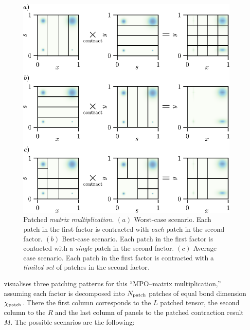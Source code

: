\begin{figure}[ht!]
\centering
\includegraphics{figures/2DPatchMatMul.pdf}
\caption{Patched \textit{matrix multiplication}. $(a)$ Worst-case scenario. Each patch in the first factor is contracted with \textit{each} patch in the second factor. $(b)$ Best-case scenario. Each patch in the first factor is contacted with a \textit{single} patch in the second factor. $(c)$ Average case scenario. Each patch in the first factor is contracted with a \textit{limited set} of patches in the second factor.}
\label{fig:2DPatchMatMul}
\end{figure}

 visualises three patching patterns for this “MPO–matrix multiplication,” assuming each factor is decomposed into \(N_{\text{patch}} \) patches of equal bond dimension \(\chi_{\text{patch}}\). There the first column corresponds to the $L$ patched tensor, the second column to the $R$ and the last column of panels to the patched contraction result $M$. The possible scenarios are the following:

